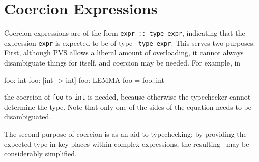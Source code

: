 \section{Coercion Expressions}\label{coercions}

Coercion expressions are of the form \texttt{expr ::\ type-expr}, indicating
that the expression \texttt{expr} is expected to be of type \texttt{
type-expr}.  This serves two purposes.  First, although PVS allows a
liberal amount of overloading, it cannot always disambiguate things for
itself, and coercion may be needed.  For example, in
\begin{pvsex}
  foo: int
  foo: [int -> int]
  foo: LEMMA foo = foo::int
\end{pvsex}
%
the coercion of \texttt{foo} to \texttt{int} is needed, because otherwise the
typechecker cannot determine the type.  Note that only one of the sides
of the equation needs to be disambiguated.

The second purpose of coercion is as an aid to typechecking; by
providing the expected type in key places within complex expressions,
the resulting \tccs\ may be considerably simplified.



